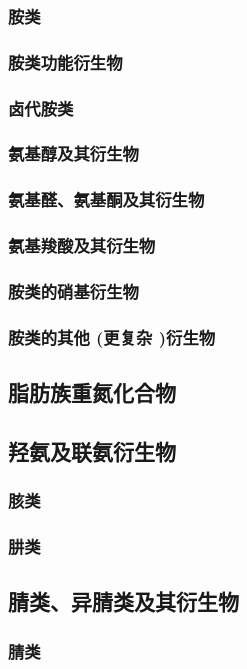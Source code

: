 \documentclass[UTF8]{../03-Chemistry}
\begin{document}
        \subsubsection{胺类}
        \subsubsection{胺类功能衍生物}
        \subsubsection{卤代胺类}
        \subsubsection{氨基醇及其衍生物}
        \subsubsection{氨基醛、氨基酮及其衍生物}
        \subsubsection{氨基羧酸及其衍生物}
        \subsubsection{胺类的硝基衍生物}
        \subsubsection{胺类的其他 (更复杂 )衍生物}
    \subsection{脂肪族重氮化合物}
    \subsection{羟氨及联氨衍生物}
        \subsubsection{胲类}
        \subsubsection{肼类}
    \subsection{腈类、异腈类及其衍生物}
        \subsubsection{腈类}
\end{document}
